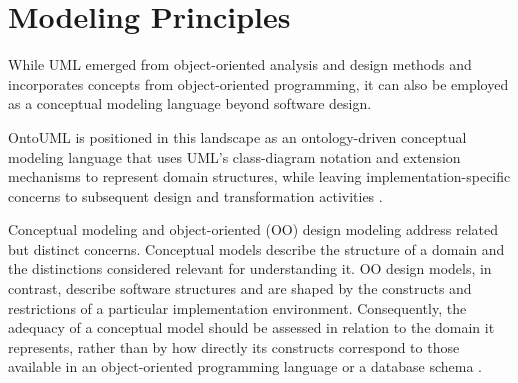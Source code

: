 
\section{Modeling Principles}

While UML emerged from object-oriented analysis and design methods and incorporates concepts from object-oriented programming, it can also be employed as a conceptual modeling language beyond software design. 

OntoUML is positioned in this landscape as an ontology-driven conceptual modeling language that uses UML's class-diagram notation and extension mechanisms to represent domain structures, while leaving implementation-specific concerns to subsequent design and transformation activities \cite{guizzardi_wagner_2010_ufo_foundation,towards_ontological_foundations_for_conceptual_modeling__the_unified_foundational_ontology__ufo__story_2015}.

Conceptual modeling and object-oriented (OO) design modeling address related but distinct concerns. Conceptual models describe the structure of a domain and the distinctions considered relevant for understanding it. OO design models, in contrast, describe software structures and are shaped by the constructs and restrictions of a particular implementation environment. Consequently, the adequacy of a conceptual model should be assessed in relation to the domain it represents, rather than by how directly its constructs correspond to those available in an object-oriented programming language or a database schema \cite{guizzardi_wagner_2010_ufo_foundation,guidoni_almeida_guizzardi_2020_relational_schemas}.

